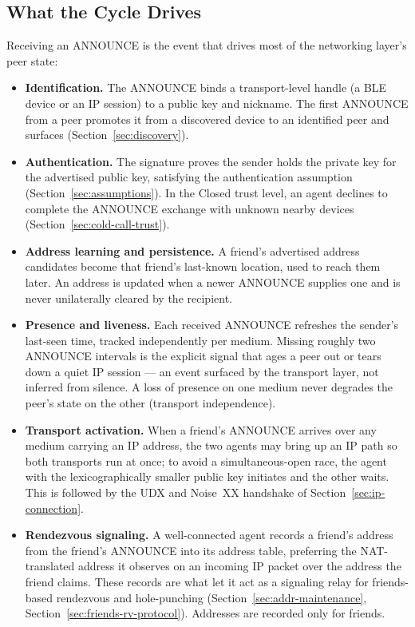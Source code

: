 \subsection{What the Cycle Drives}
\label{sec:announce-drives}
Receiving an ANNOUNCE is the event that drives most of the networking layer's peer state:
\begin{itemize}
\item \textbf{Identification.} The ANNOUNCE binds a transport-level handle (a BLE device or an IP session) to a public key and nickname. The first ANNOUNCE from a peer promotes it from a discovered device to an identified peer and surfaces  (Section~\ref{sec:discovery}).
\item \textbf{Authentication.} The signature proves the sender holds the private key for the advertised public key, satisfying the authentication assumption (Section~\ref{sec:assumptions}). In the Closed trust level, an agent declines to complete the ANNOUNCE exchange with unknown nearby devices (Section~\ref{sec:cold-call-trust}).
\item \textbf{Address learning and persistence.} A friend's advertised address candidates become that friend's last-known location, used to reach them later. An address is updated when a newer ANNOUNCE supplies one and is never unilaterally cleared by the recipient.
\item \textbf{Presence and liveness.} Each received ANNOUNCE refreshes the sender's last-seen time, tracked independently per medium. Missing roughly two ANNOUNCE intervals is the explicit signal that ages a peer out or tears down a quiet IP session --- an event surfaced by the transport layer, not inferred from silence. A loss of presence on one medium never degrades the peer's state on the other (transport independence).
\item \textbf{Transport activation.} When a friend's ANNOUNCE arrives over any medium carrying an IP address, the two agents may bring up an IP path so both transports run at once; to avoid a simultaneous-open race, the agent with the lexicographically smaller public key initiates and the other waits. This is followed by the UDX and Noise~XX handshake of Section~\ref{sec:ip-connection}.
\item \textbf{Rendezvous signaling.} A well-connected agent records a friend's address from the friend's ANNOUNCE into its address table, preferring the NAT-translated address it observes on an incoming IP packet over the address the friend claims. These records are what let it act as a signaling relay for friends-based rendezvous and hole-punching (Section~\ref{sec:addr-maintenance}, Section~\ref{sec:friends-rv-protocol}). Addresses are recorded only for friends.
\end{itemize}
